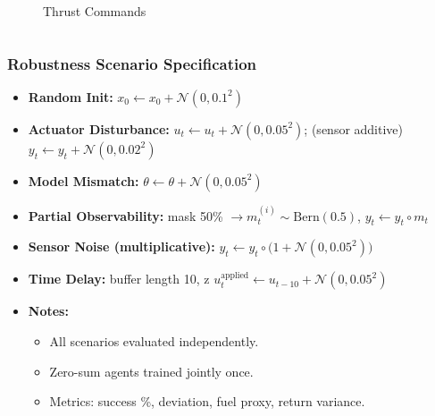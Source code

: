 \begin{frame}
\begin{columns}[T]
\begin{column}{0.48\textwidth}
\begin{figure}
        \caption{\scriptsize Thrust Commands}
      \end{figure}
    \end{column}
  \end{columns}
\end{frame}





\begin{frame}
  \frametitle{Robustness Scenario Specification}
  \small
  \begin{itemize}
    \item \textbf{Random Init:} $x_0 \leftarrow x_0 + \mathcal{N}(0,0.1^2)$
    \item \textbf{Actuator Disturbance:} $u_t \leftarrow u_t + \mathcal{N}(0,0.05^2)$; (sensor additive) $y_t \leftarrow y_t + \mathcal{N}(0,0.02^2)$
    \item \textbf{Model Mismatch:} $\theta \leftarrow \theta + \mathcal{N}(0,0.05^2)$
    \item \textbf{Partial Observability:} mask 50\% $\to m_t^{(i)}\sim \mathrm{Bern}(0.5)$, $y_t \leftarrow y_t \circ m_t$
    \item \textbf{Sensor Noise (multiplicative):} $y_t \leftarrow y_t \circ \bigl(1 + \mathcal{N}(0,0.05^2)\bigr)$
    \item \textbf{Time Delay:} buffer length 10, z
      $u_t^{\mathrm{applied}} \leftarrow u_{t-10} + \mathcal{N}(0,0.05^2)$
    \item \textbf{Notes:}
      \begin{itemize}
        \small
        \setlength{\itemsep}{1pt}
        \item All scenarios evaluated independently.
        \item Zero-sum agents trained jointly once.
        \item Metrics: success \%, deviation, fuel proxy, return variance.
      \end{itemize}
  \end{itemize}
  \vspace{2pt}
\end{frame}



